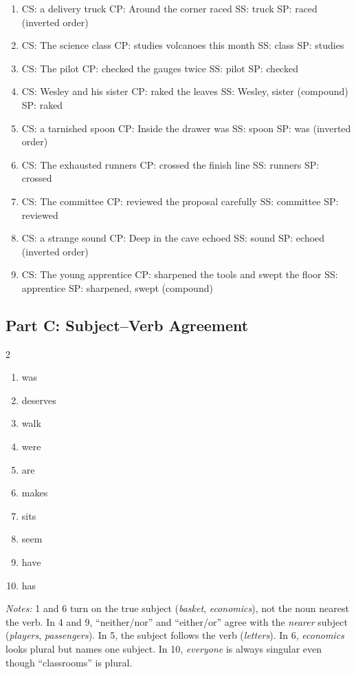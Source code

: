 \documentclass[11pt]{article}
\begin{document}
\begin{enumerate}
  \item CS: a delivery truck \quad CP: Around the corner raced \quad SS: truck \quad SP: raced \quad (inverted order)
  \item CS: The science class \quad CP: studies volcanoes this month \quad SS: class \quad SP: studies
  \item CS: The pilot \quad CP: checked the gauges twice \quad SS: pilot \quad SP: checked
  \item CS: Wesley and his sister \quad CP: raked the leaves \quad SS: Wesley, sister (compound) \quad SP: raked
  \item CS: a tarnished spoon \quad CP: Inside the drawer was \quad SS: spoon \quad SP: was \quad (inverted order)
  \item CS: The exhausted runners \quad CP: crossed the finish line \quad SS: runners \quad SP: crossed
  \item CS: The committee \quad CP: reviewed the proposal carefully \quad SS: committee \quad SP: reviewed
  \item CS: a strange sound \quad CP: Deep in the cave echoed \quad SS: sound \quad SP: echoed \quad (inverted order)
  \item CS: The young apprentice \quad CP: sharpened the tools and swept the floor \quad SS: apprentice \quad SP: sharpened, swept (compound)
\end{enumerate}

\subsection*{Part C: Subject--Verb Agreement}
\begin{multicols}{2}
\begin{enumerate}
  \item was
  \item deserves
  \item walk
  \item were
  \item are
  \item makes
  \item sits
  \item seem
  \item have
  \item has
\end{enumerate}
\end{multicols}
\noindent\textit{Notes:} 1 and 6 turn on the true subject (\textit{basket}, \textit{economics}), not the noun nearest the verb. In 4 and 9, ``neither/nor'' and ``either/or'' agree with the \textit{nearer} subject (\textit{players}, \textit{passengers}). In 5, the subject follows the verb (\textit{letters}). In 6, \textit{economics} looks plural but names one subject. In 10, \textit{everyone} is always singular even though ``classrooms'' is plural.
\end{document}
